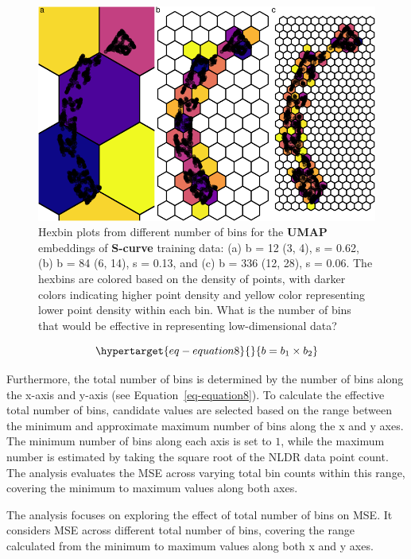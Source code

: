 \documentclass[
  12pt]{article}
\begin{document}
\begin{figure}[H]

{\centering \includegraphics{paper_files/figure-pdf/fig-binsize-1.pdf}

}

\caption{\label{fig-binsize}Hexbin plots from different number of bins
for the \textbf{UMAP} embeddings of \textbf{S-curve} training data: (a)
b = 12 (3, 4), s = 0.62, (b) b = 84 (6, 14), s = 0.13, and (c) b = 336
(12, 28), s = 0.06. The hexbins are colored based on the density of
points, with darker colors indicating higher point density and yellow
color representing lower point density within each bin. What is the
number of bins that would be effective in representing low-dimensional
data?}

\end{figure}

\begin{equation}\protect\hypertarget{eq-equation8}{}{
b = b_1 \times b_2
}\label{eq-equation8}\end{equation}

Furthermore, the total number of bins is determined by the number of
bins along the x-axis and y-axis (see Equation~\ref{eq-equation8}). To
calculate the effective total number of bins, candidate values are
selected based on the range between the minimum and approximate maximum
number of bins along the x and y axes. The minimum number of bins along
each axis is set to \(1\), while the maximum number is estimated by
taking the square root of the NLDR data point count. The analysis
evaluates the MSE across varying total bin counts within this range,
covering the minimum to maximum values along both axes.

The analysis focuses on exploring the effect of total number of bins on
MSE. It considers MSE across different total number of bins, covering
the range calculated from the minimum to maximum values along both x and
y axes.
\end{document}
